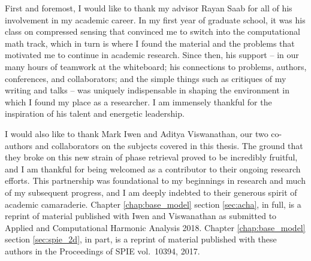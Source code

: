   First and foremost, I would like to thank my advisor Rayan Saab for all of his involvement in my academic career.  In my first year of graduate school, it was his class on compressed sensing that convinced me to switch into the computational math track, which in turn is where I found the material and the problems that motivated me to continue in academic research.  Since then, his support -- in our many hours of teamwork at the whiteboard; his connections to problems, authors, conferences, and collaborators; and the simple things such as critiques of my writing and talks -- was uniquely indispensable in shaping the environment in which I found my place as a researcher.  I am immensely thankful for the inspiration of his talent and energetic leadership.

  I would also like to thank Mark Iwen and Aditya Viswanathan, our two co-authors and collaborators on the subjects covered in this thesis.  The ground that they broke on this new strain of phase retrieval proved to be incredibly fruitful, and I am thankful for being welcomed as a contributor to their ongoing research efforts.  This partnership was foundational to my beginnings in research and much of my subsequent progress, and I am deeply indebted to their generous spirit of academic camaraderie.  Chapter \ref{chap:base_model} section \ref{sec:acha}, in full, is a reprint of material published with Iwen and Viswanathan as submitted to Applied and Computational Harmonic Analysis 2018.  Chapter \ref{chap:base_model} section \ref{sec:spie_2d}, in part, is a reprint of material published with these authors in the Proceedings of SPIE vol.~10394, 2017.

  
